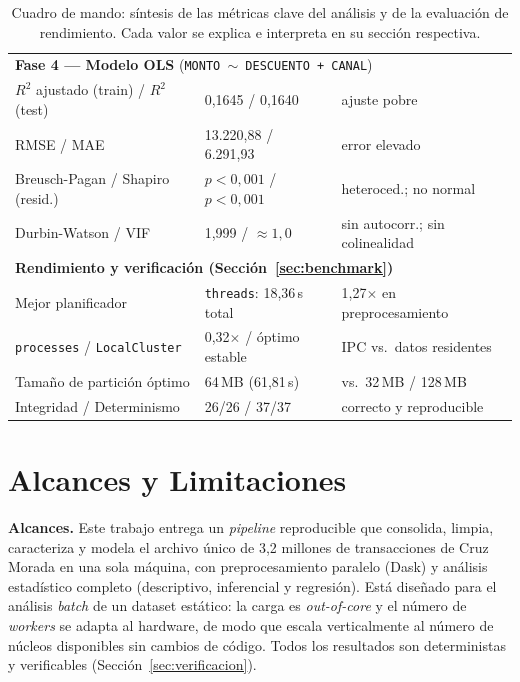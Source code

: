 \documentclass[12pt,letterpaper]{article}
\begin{document}
\begin{table}[H]
\begin{tabular}{p{5.6cm} p{4.3cm} p{4.0cm}}
\midrule
\multicolumn{3}{l}{\textbf{Fase 4 --- Modelo OLS} (\texttt{MONTO $\sim$ DESCUENTO + CANAL})} \\
$R^2$ ajustado (train) / $R^2$ (test) & 0,1645 / 0,1640 & ajuste pobre \\
RMSE / MAE & 13.220,88 / 6.291,93 & error elevado \\
Breusch-Pagan / Shapiro (resid.) & $p<0{,}001$ / $p<0{,}001$ & heteroced.; no normal \\
Durbin-Watson / VIF & 1,999 / $\approx 1{,}0$ & sin autocorr.; sin colinealidad \\
\midrule
\multicolumn{3}{l}{\textbf{Rendimiento y verificación (Sección~\ref{sec:benchmark})}} \\
Mejor planificador & \texttt{threads}: 18,36\,s total & 1,27$\times$ en preprocesamiento \\
\texttt{processes} / \texttt{LocalCluster} & 0,32$\times$ / óptimo estable & IPC vs.\ datos residentes \\
Tamaño de partición óptimo & 64\,MB (61,81\,s) & vs.\ 32\,MB / 128\,MB \\
Integridad / Determinismo & 26/26 / 37/37 & correcto y reproducible \\
\bottomrule
\end{tabular}
\caption{Cuadro de mando: síntesis de las métricas clave del análisis y de la evaluación de
rendimiento. Cada valor se explica e interpreta en su sección respectiva.}
\label{tab:dashboard}
\end{table}

\section{Alcances y Limitaciones}
\label{sec:alcances}
\textbf{Alcances.} Este trabajo entrega un \textit{pipeline} reproducible que consolida, limpia,
caracteriza y modela el archivo único de 3,2 millones de transacciones de Cruz Morada en una sola
máquina, con preprocesamiento paralelo (Dask) y análisis estadístico completo (descriptivo,
inferencial y regresión). Está diseñado para el análisis \textit{batch} de un dataset estático: la
carga es \textit{out-of-core} y el número de \textit{workers} se adapta al hardware, de modo que
escala verticalmente al número de núcleos disponibles sin cambios de código. Todos los resultados son
deterministas y verificables (Sección~\ref{sec:verificacion}).
\end{document}
